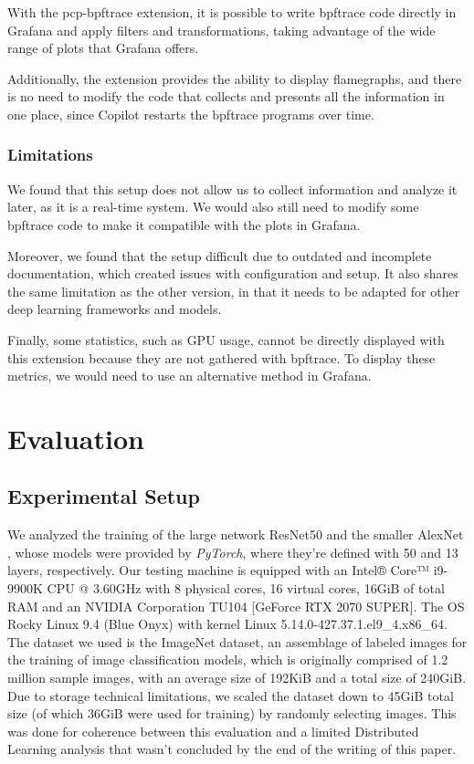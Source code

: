 \documentclass[conference]{IEEEtran}
\begin{document}
With the pcp-bpftrace extension, it is possible to write bpftrace code directly in Grafana and apply filters and transformations, taking advantage of the wide range of plots that Grafana offers.

Additionally, the extension provides the ability to display flamegraphs, and there is no need to modify the code that collects and presents all the information in one place, since Copilot restarts the bpftrace programs over time.

\subsubsection{Limitations}

We found that this setup does not allow us to collect information and analyze it later, as it is a real-time system.
We would also still need to modify some bpftrace code to make it compatible with the plots in Grafana.

Moreover, we found that the setup difficult due to outdated and incomplete documentation, which created issues with configuration and setup.
It also shares the same limitation as the other version, in that it needs to be adapted for other deep learning frameworks and models.

Finally, some statistics, such as GPU usage, cannot be directly displayed with this extension because they are not gathered with bpftrace. To display these metrics, we would need to use an alternative method in Grafana.

\section{Evaluation}

\subsection{Experimental Setup}

We analyzed the training of the large network ResNet50 \cite{resnet50} and the smaller AlexNet \cite{alexnet}, whose models were
provided by \textit{PyTorch}, where they're defined with 50 and 13 layers, respectively. Our testing machine is equipped with an Intel® Core™ i9-9900K CPU @ 3.60GHz with
8 physical cores, 16 virtual cores, 16GiB of total RAM and an NVIDIA Corporation TU104 [GeForce RTX 2070 SUPER]. The OS  Rocky Linux 9.4 (Blue Onyx) with kernel Linux 5.14.0-427.37.1.el9\_4.x86\_64. The dataset we used is the ImageNet \cite{imagenet} dataset, an assemblage of labeled images for the training of image classification models, which is originally comprised of 1.2 million sample images, with an average size of 192KiB and a total size of 240GiB. Due to storage technical limitations, we scaled the dataset down to 45GiB total size (of which 36GiB were used for training) by randomly selecting images. This was done for coherence between this evaluation and a limited Distributed Learning analysis that wasn't concluded by the end of the writing of this paper.
\end{document}
